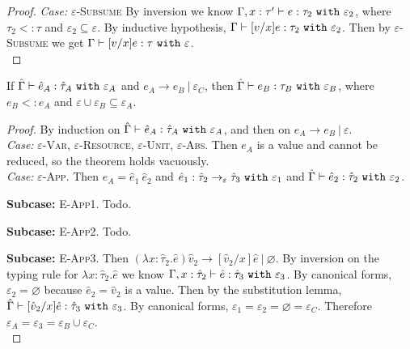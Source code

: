 \begin{appendix}
\begin{proof}
\textit{Case:} \textsc{$\varepsilon$-Subsume} By inversion we know $ \Gamma, x:  \tau' \vdash  e:  \tau_2~\mathtt{with}~ \varepsilon_2$, where $ \tau_2 <:  \tau$ and $\varepsilon_2 \subseteq \varepsilon$. By inductive hypothesis, $ \Gamma \vdash [ v/x] e:  \tau_2~\mathtt{with}~ \varepsilon_2$. Then by \textsc{$\varepsilon$-Subsume} we get $ \Gamma \vdash [ v/x] e:  \tau~\mathtt{with}~ \varepsilon$. \\

\end{proof}


\hrulefill

\begin{theorem}[Preservation]
If $\hat \Gamma \vdash \hat e_A: \hat \tau_A~\mathtt{with}~ \varepsilon_A$ and $e_A \longrightarrow e_B~|~\varepsilon_C$, then $\hat \Gamma \vdash e_B: \tau_B~\mathtt{with}~ \varepsilon_B$, where $e_B <: e_A$ and $\varepsilon \cup \varepsilon_B \subseteq \varepsilon_A$.
\end{theorem}

\begin{proof}
By induction on $\hat \Gamma \vdash \hat e_A: \hat \tau_A~\mathtt{with}~ \varepsilon_A$, and then on $e_A \longrightarrow e_B~|~\varepsilon$. \\

\textit{Case:} \textsc{$\varepsilon$-Var}, \textsc{$\varepsilon$-Resource}, \textsc{$\varepsilon$-Unit}, \textsc{$\varepsilon$-Abs}. Then $e_A$ is a value and cannot be reduced, so the theorem holds vacuously. \\

\textit{Case:} \textsc{$\varepsilon$-App}. Then $e_A = \hat e_1~\hat e_2$ and $\hat e_1: \hat \tau_2 \rightarrow_{\varepsilon} \hat \tau_3~\mathtt{with}~ \varepsilon_1$ and $\hat \Gamma \vdash \hat e_2: \hat \tau_2~\mathtt{with}~ \varepsilon_2$.

\textbf{Subcase:} \textsc{E-App1}. Todo.

\textbf{Subcase:} \textsc{E-App2}. Todo.

\textbf{Subcase:} \textsc{E-App3}. Then $(\lambda x: \hat \tau_2.\hat e)\hat v_2 \longrightarrow [\hat v_2/x]\hat e~|~\varnothing$. By inversion on the typing rule for $\lambda x: \hat \tau_2.\hat e$ we know $\Gamma, x: \hat \tau_2 \vdash \hat e: \hat \tau_3~\mathtt{with}~ \varepsilon_3$. By canonical forms, $\varepsilon_2 = \varnothing$ because $\hat e_2 = \hat v_2$ is a value. Then by the substitution lemma, $\hat \Gamma \vdash [\hat v_2/x]\hat e : \hat \tau_3~\mathtt{with}~ \varepsilon_3$. By canonical forms, $\varepsilon_1 = \varepsilon_2 = \varnothing = \varepsilon_C$. Therefore $\varepsilon_A = \varepsilon_3 = \varepsilon_B \cup \varepsilon_C$. \\


\end{proof}
\end{appendix}
